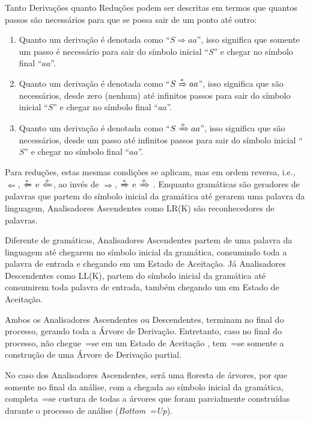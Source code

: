 {    Tanto Derivações quanto Reduções podem ser descritas em termos que quantos passos são necessários para que se possa sair de um ponto até outro:
    \begin{enumerate}%
        \item Quanto um derivação é denotada como ``$S \Rightarrow a a $'',
        isso significa que somente um passo é necessário para sair do símbolo inicial ``$S$'' e
        chegar no símbolo final ``$a a$''.
        \item Quanto um derivação é denotada como ``$S \xRightarrow{*} a a $'',
        isso significa que são necessários,
        desde zero (nenhum) até infinitos passos para sair do símbolo inicial ``$S$'' e
        chegar no símbolo final ``$a a$''.
        \item Quanto um derivação é denotada como ``$S \xRightarrow{+} a a $'',
        isso significa que são necessários,
        desde um passo até infinitos passos para sair do símbolo inicial ``$S$'' e
        chegar no símbolo final ``$a a$''.
    \end{enumerate}

    Para reduções,
    estas mesmas condições se aplicam,
    mas em ordem reversa,
    i.e., $\Leftarrow$, $\xLeftarrow{*}$ e $\xLeftarrow{+}$,
    ao invés de $\Rightarrow$,
    $\xRightarrow{*}$ e
    $\xRightarrow{+}$ \cite{ahoCompilerDragonBook}.
    Enquanto gramáticas são geradores de palavras que partem do símbolo inicial da gramática até gerarem uma palavra da linguagem,
    Analisadores Ascendentes como LR(K) são reconhecedores de palavras.

    Diferente de gramáticas,
    Analisadores Ascendentes partem de uma palavra da linguagem até chegarem no símbolo inicial da gramática,
    consumindo toda a palavra de entrada e
    chegando em um Estado de Aceitação.
    Já Analisadores Descendentes como LL(K),
    partem do símbolo inicial da gramática até consumirem toda palavra de entrada,
    também chegando um em Estado de Aceitação.

    Ambos os Analisadores Ascendentes ou
    Descendentes,
    terminam no final do processo,
    gerando toda a Árvore de Derivação.
    Entretanto,
    caso no final do processo,
    não chegue~=se em um Estado de Aceitação \cite{ahoCompilerDragonBook},
    tem~=se somente a construção de uma Árvore de Derivação partial.

    No caso dos Analisadores Ascendentes,
    será uma floresta de árvores,
    por que somente no final da análise,
    com a chegada ao símbolo inicial da gramática,
    completa~=se custura de todas a árvores que foram parcialmente construídas durante o processo de análise (\textit{Bottom~=Up}).

}
